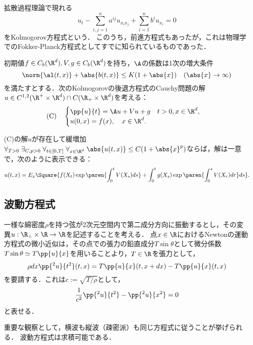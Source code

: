 \documentclass[uplatex,dvipdfmx]{jsreport}
\begin{document}
\begin{model}
    拡散過程理論で現れる
    \[u_t-\sum_{i,j=1}^na^{ij}u_{x_ix_j}+\sum_{i=1}^nb^iu_{x_i}=0\]
    をKolmogorov方程式という．
    このうち，前進方程式もあったが，これは物理学でのFokker-Planck方程式としてすでに知られているものであった．
\end{model}

\begin{problem}[Kolmogorovの後退方程式に関するCauchy問題]
    初期値$f\in C_b(\R^d),V,g\in C_b(\R^d)$を持ち，$\A$の係数は1次の増大条件
    \[\norm{\al(t,x)}+\abs{b(t,x)}\le K(1+\abs{x})\quad(\abs{x}\to\infty)\]
    を満たすとする．次のKolmogorovの後退方程式のCauchy問題の解$u\in C^{1,2}(\R^+\times\R^d)\cap C(\R_+\times\R^d)$を考える：
    \[\mathrm{(C)}\quad\begin{cases}
        \pp{u}{t}=\A u+Vu+g\quad t>0,x\in\R^d,\\
        u(0,x)=f(x),\quad x\in\R^d.
    \end{cases}\]
\end{problem}


\begin{theorem}
    (C)の解$u$が存在して緩増加$\forall_{T>0}\;\exists_{C,p>0}\;\forall_{t\in[0,T]}\;\forall_{x\in\R^d}\;\abs{u(t,x)}\le C(1+\abs{x}^p)$ならば，解は一意で，次のように表示できる：
    \[u(t,x)=E_x\Square{f(X_t)\exp\paren{\int^t_0V(X_s)ds}+\int^t_0g(X_s)\exp\paren{\int^s_0V(X_r)dr}ds}.\]
\end{theorem}

\subsection{波動方程式}

\begin{model}[弦の振動の模型]
    一様な綿密度$\rho$を持つ弦が2次元空間内で第二成分方向に振動するとし，その変異$u:\R_+\times\R\to\R$を記述することを考える．
    点$x\in\R$におけるNewtonの運動方程式の微小近似は，その点での張力の鉛直成分$T\sin\theta$として微分係数$T\sin\theta\simeq T\pp{u}{x}$を用いることより，$T\in\R$を張力として，
    \[\rho dx\pp{^2u}{t^2}(t,x)=T\pp{u}{x}(t,x+dx)-T\pp{u}{x}(t,x)\]
    を要請する．これは$c:=\sqrt{T/\rho}$として，
    \[\frac{1}{c^2}\pp{^2u}{t^2}-\pp{^2u}{x^2}=0\]
    と表せる．
\end{model}
\begin{remarks}
    重要な観察として，横波も縦波（疎密派）も同じ方程式に従うことが挙げられる．
    波動方程式は求積可能である．
\end{remarks}
\end{document}
